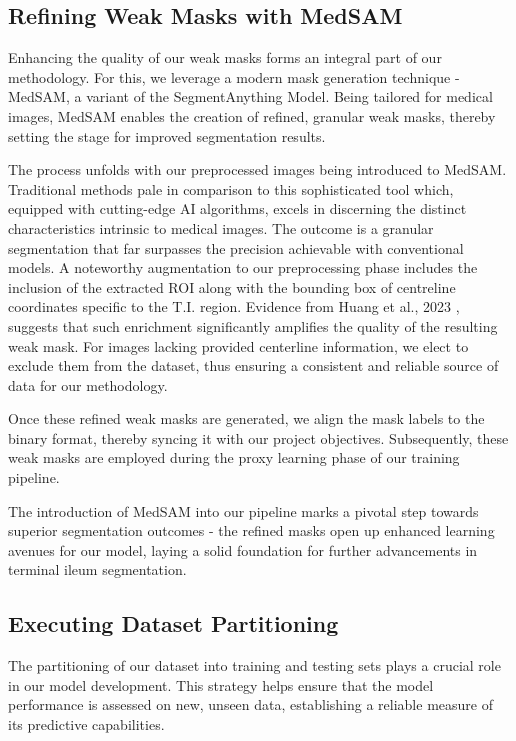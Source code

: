 \subsection{Refining Weak Masks with MedSAM}

Enhancing the quality of our weak masks forms an integral part of our methodology. For this, we leverage a modern mask generation technique - MedSAM, a variant of the SegmentAnything Model. Being tailored for medical images, MedSAM enables the creation of refined, granular weak masks, thereby setting the stage for improved segmentation results.

The process unfolds with our preprocessed images being introduced to MedSAM. Traditional methods pale in comparison to this sophisticated tool which, equipped with cutting-edge AI algorithms, excels in discerning the distinct characteristics intrinsic to medical images. The outcome is a granular segmentation that far surpasses the precision achievable with conventional models. A noteworthy augmentation to our preprocessing phase includes the inclusion of the extracted ROI along with the bounding box of centreline coordinates specific to the T.I. region. Evidence from Huang et al., 2023 \cite{huang2023segment}, suggests that such enrichment significantly amplifies the quality of the resulting weak mask. For images lacking provided centerline information, we elect to exclude them from the dataset, thus ensuring a consistent and reliable source of data for our methodology.

Once these refined weak masks are generated, we align the mask labels to the binary format, thereby syncing it with our project objectives. Subsequently, these weak masks are employed during the proxy learning phase of our training pipeline.

The introduction of MedSAM into our pipeline marks a pivotal step towards superior segmentation outcomes - the refined masks open up enhanced learning avenues for our model, laying a solid foundation for further advancements in terminal ileum segmentation.

\subsection{Executing Dataset Partitioning}

The partitioning of our dataset into training and testing sets plays a crucial role in our model development. This strategy helps ensure that the model performance is assessed on new, unseen data, establishing a reliable measure of its predictive capabilities.

